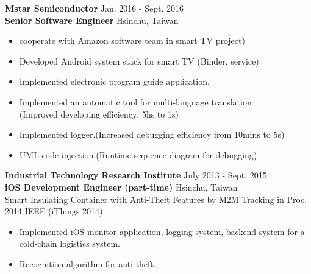 \documentclass{res}
\begin{document}
\begin{resume}
\begin{itemize}[leftmargin=*]
				\end{itemize}
				\vspace{-0.12in}
				{\bf Mstar Semiconductor} 		 {\hfill Jan. 2016 - Sept. 2016}\\
				{\bf Senior Software Engineer}		 {\hfill Hsinchu, Taiwan}

				\begin{itemize}[leftmargin=*]

					\item cooperate with Amazon software team in smart TV project)
					\vspace{-0.05in}	
					\item Developed Android system stack for smart TV (Binder, service)	
					\vspace{-0.05in}
					\item Implemented electronic program guide application.
					\vspace{-0.05in}
					\item Implemented an automatic tool for multi-language translation \\(Improved developing efficiency: 5hs to 1s)
					\vspace{-0.05in}		
					\item Implemented logger.(Increased debugging efficiency from 10mins to 5s)
					\vspace{-0.05in}	
					\item UML code injection.(Runtime sequence diagram for debugging)

				\end{itemize}
				\vspace{-0.12in}
				{\bf Industrial Technology Research Institute } {\hfill July 2013 - Sept. 2015}\\	
				{\bf iOS Development Engineer (part-time)}                        {\hfill Hsinchu, Taiwan}\\
				Smart Insulating Container with Anti-Theft Features by M2M Tracking {\footnotesize in Proc. 2014 IEEE (iThings 2014)}
				\vspace{0.05in}
				\begin{itemize}[leftmargin=*]


					\item Implemented iOS monitor application, logging system, backend system for a cold-chain logistics system.
					\vspace{-0.05in} 
					\item Recognition algorithm for anti-theft.
				\end{itemize}
				\vspace{-0.12in}


\end{resume}
\end{document}
